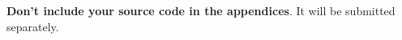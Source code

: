 \documentclass{l4proj}
\begin{document}
\begin{appendices}
\begin{itemize}
\end{itemize}

\textbf{Don't include your source code in the appendices}. It will be
submitted separately.



\end{appendices}





\renewcommand{\thechapter}{0} 

\end{document}
